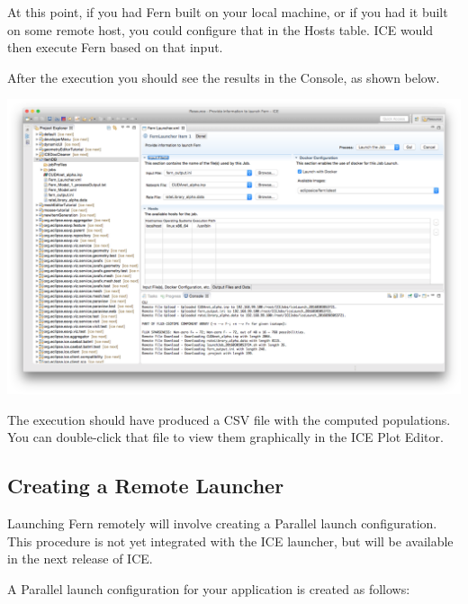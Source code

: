 At this point, if you had Fern built on your local machine, or if you had it
built on some remote host, you could configure that in the Hosts table. ICE
would then execute Fern based on that input. 

After the execution you should see the results in the Console, as shown below.
\begin{center} \includegraphics[width=\textwidth]{figures/launcherResult}
\end{center}
The execution should have produced a CSV file with the computed populations. You
can double-click that file to view them graphically in the ICE Plot Editor. 

\subsection{Creating a Remote Launcher}

Launching Fern remotely will involve creating a Parallel launch configuration.
This procedure is not yet integrated with the ICE launcher, but will be
available in the next release of ICE.

A Parallel launch configuration for your application is created as follows:

